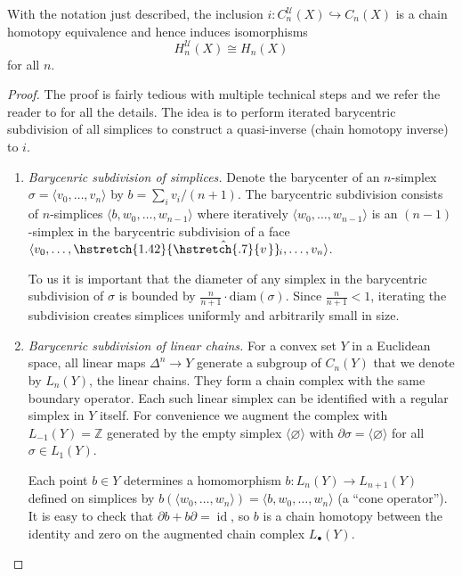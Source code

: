 \documentclass[english,letterpaper]{article}%
\numberwithin{equation}{section}
\numberwithin{figure}{section}
\numberwithin{table}{section}
\theoremstyle{definition}
\theoremstyle{definition}
\theoremstyle{definition}
\theoremstyle{plain}
\theoremstyle{plain}
\theoremstyle{plain}
\theoremstyle{plain}
\theoremstyle{remark}
\theoremstyle{remark}
\newcommand{\bbZ}{\mathbb{Z}}
\newcommand{\calU}{\mathcal{U}}
\DeclareMathOperator{\id}{id}
\newcommand\wh[1]{\hstretch{1.42}{\hat{\hstretch{.7}{#1\mkern2mu}}}\mkern-2mu} %
\begin{document}
\begin{prop}
    With the notation just described, the inclusion $i:C_n^\calU(X)\hookrightarrow C_n(X)$ is a chain homotopy equivalence and hence induces isomorphisms
    \[H_n^\calU(X)\cong H_n(X)\]
    for all $n$.
\end{prop}
\begin{proof}
     The proof is fairly tedious with multiple technical steps and we refer the reader to \cite[Thm. 2.21]{Hatcher} for all the details. The idea is to perform iterated barycentric subdivision of all simplices to construct a quasi-inverse (chain homotopy inverse) to $i$. 
     
     \begin{enumerate}
         \item \emph{Barycenric subdivision of simplices.} Denote the barycenter of an $n$-simplex $\sigma=\langle v_0,\ldots,v_n\rangle$ by  $b=\sum_i v_i/(n+1)$. The barycentric subdivision consists of $n$-simplices $\langle b,w_0,\ldots,w_{n-1}
         \rangle$ where iteratively $\langle w_0,\ldots,w_{n-1}\rangle$ is an $(n-1)$-simplex in the barycentric subdivision of a face $\langle v_0,\ldots,\wh{v}_i,\ldots,v_n\rangle$.
         
         To us it is important that the diameter of any simplex in the barycentric subdivision of $\sigma$ is bounded by $\frac{n}{n+1}\cdot \text{diam}(\sigma)$. Since $\frac{n}{n+1}<1$, iterating the subdivision creates simplices uniformly and arbitrarily small in size.
         
         \item \emph{Barycenric subdivision of linear chains.} For a convex set $Y$ in a Euclidean space, all linear maps $\Delta^n\to Y$ generate a subgroup of $C_n(Y)$ that we denote by $L_n(Y)$, the linear chains. They form a chain complex with the same boundary operator. Each such linear simplex can be identified with a regular simplex in $Y$ itself.  For convenience we augment the complex with $L_{-1}(Y)=\bbZ$ generated by the empty simplex $\langle \varnothing \rangle$ with $\partial \sigma=\langle \varnothing \rangle$ for all $\sigma\in L_1(Y)$.
         
         Each point $b\in Y$ determines a homomorphism $b:L_n(Y)\to L_{n+1}(Y)$ defined on simplices by $b(\langle w_0,\ldots,w_n\rangle)=\langle b,w_0,\ldots,w_n\rangle$ (a ``cone operator''). It is easy to check that $\partial b+b\partial =\id$, so $b$ is a chain homotopy between the identity and zero on the augmented chain complex $L_\bullet(Y)$.
         

\end{enumerate}
\end{proof}
\end{document}
